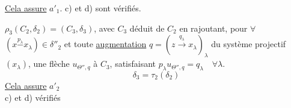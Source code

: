 \uline{Cela assure} $a'_1$. c) et d) sont vérifiés.

$\rho_3(C_2,\delta_2)=(C_3,\delta_3)$,  avec $C_3$ déduit de $C_2$ en rajoutant, pour $\forall$   $(x\overset{p_\lambda}{-}x_\lambda)\in\delta''_2$ et toute \uline{augmentation} $q=(z\xrightarrow{q_\lambda}x_\lambda)_\lambda$ du système projectif $(x_\lambda)$, une flèche $u_{\Theta'',q}$ à $C_3$, satisfaisant $p_\lambda u_{\Theta'',q}=q_\lambda\quad\forall\lambda$.
\[
\delta_3=\tau_2(\delta_2)
\]
\uline{Cela assure} $a'_2$\\
c) et d) vérifiés

